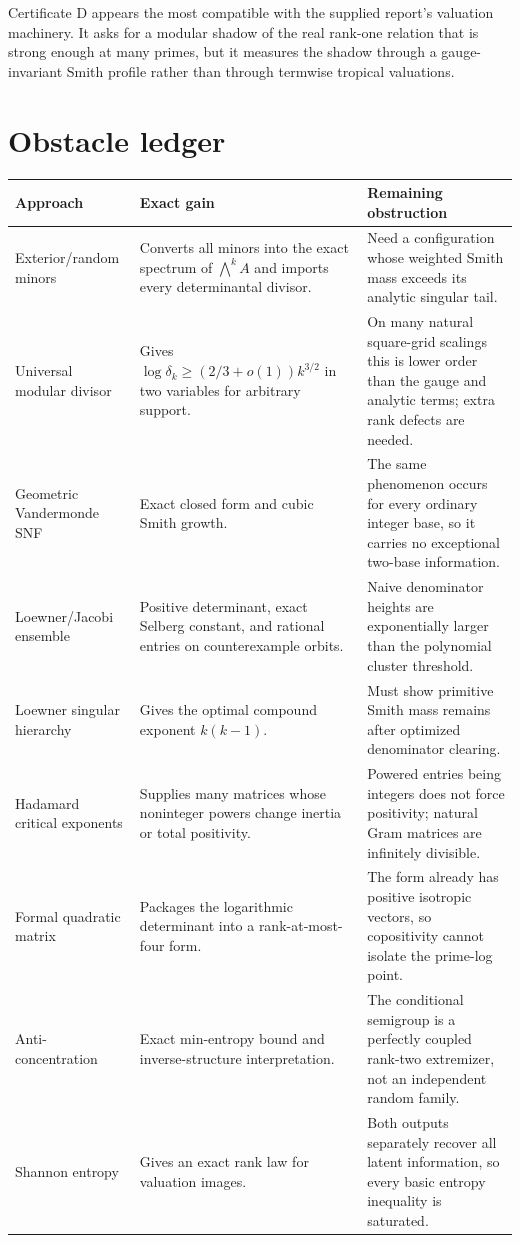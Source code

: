 \documentclass[11pt,oneside]{article}
\theoremstyle{definition}
\theoremstyle{remark}
\begin{document}
\begin{targetbox}
Certificate D appears the most compatible with the supplied report's valuation machinery.  It asks for a modular shadow of the real rank-one relation that is strong enough at many primes, but it measures the shadow through a gauge-invariant Smith profile rather than through termwise tropical valuations.
\end{targetbox}

\section{Obstacle ledger}
\label{sec:obstacles}

\begin{longtable}{@{}>{\raggedright\arraybackslash}p{}>{\raggedright\arraybackslash}p{}>{\raggedright\arraybackslash}p{}@{}}
\toprule
Approach & Exact gain & Remaining obstruction \\
\midrule
\endhead
Exterior/random minors & Converts all minors into the exact spectrum of $\bigwedge^kA$ and imports every determinantal divisor. & Need a configuration whose weighted Smith mass exceeds its analytic singular tail.\\
Universal modular divisor & Gives $\log\delta_k\ge(2/3+o(1))k^{3/2}$ in two variables for arbitrary support. & On many natural square-grid scalings this is lower order than the gauge and analytic terms; extra rank defects are needed.\\
Geometric Vandermonde SNF & Exact closed form and cubic Smith growth. & The same phenomenon occurs for every ordinary integer base, so it carries no exceptional two-base information.\\
Loewner/Jacobi ensemble & Positive determinant, exact Selberg constant, and rational entries on counterexample orbits. & Naive denominator heights are exponentially larger than the polynomial cluster threshold.\\
Loewner singular hierarchy & Gives the optimal compound exponent $k(k-1)$. & Must show primitive Smith mass remains after optimized denominator clearing.\\
Hadamard critical exponents & Supplies many matrices whose noninteger powers change inertia or total positivity. & Powered entries being integers does not force positivity; natural Gram matrices are infinitely divisible.\\
Formal quadratic matrix & Packages the logarithmic determinant into a rank-at-most-four form. & The form already has positive isotropic vectors, so copositivity cannot isolate the prime-log point.\\
Anti-concentration & Exact min-entropy bound and inverse-structure interpretation. & The conditional semigroup is a perfectly coupled rank-two extremizer, not an independent random family.\\
Shannon entropy & Gives an exact rank law for valuation images. & Both outputs separately recover all latent information, so every basic entropy inequality is saturated.\\
\bottomrule
\end{longtable}
\end{document}
